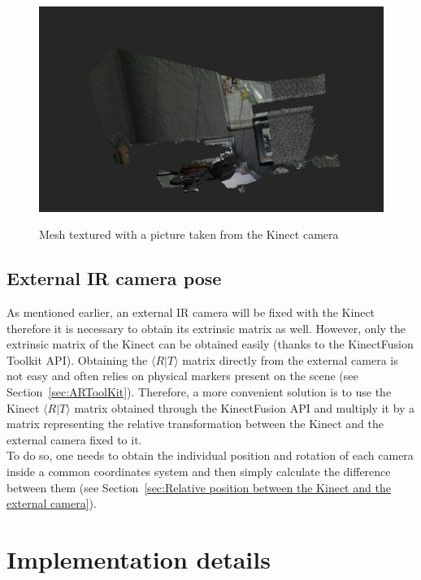 \begin{figure}
\caption{Mesh textured with a picture taken from the Kinect camera}
\centering
    \includegraphics[width=1.0\textwidth]{images/resultfromkinect.jpg}
\label{fig:result from kinect}
\end{figure}


\subsection{External IR camera pose}

As mentioned earlier, an external IR camera will be fixed with the Kinect therefore it is necessary to obtain its extrinsic matrix as well. However, only the extrinsic matrix of the Kinect can be obtained easily (thanks to the KinectFusion Toolkit API). Obtaining the $\langle R\vert T\rangle$ matrix directly from the external camera is not easy and often relies on physical markers present on the scene (see Section~\ref{sec:ARToolKit}). Therefore, a more convenient solution is to use the Kinect $\langle R\vert T\rangle$ matrix obtained through the KinectFusion API and multiply it by a matrix representing the relative transformation between the Kinect and the external camera fixed to it.\\

To do so, one needs to obtain the individual position and rotation of each camera inside a common coordinates system and then simply calculate the difference between them (see Section~\ref{sec:Relative position between the Kinect and the external camera}).


\section{Implementation details}

